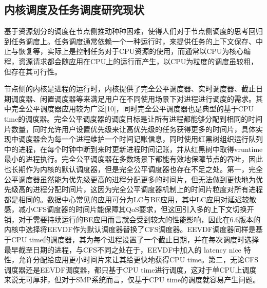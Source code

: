 \subsection{内核调度及任务调度研究现状}

基于资源划分的调度在节点侧推动种种困难，使得人们对于节点侧调度的思考回归到任务调度上\citep{fried2020caladan, ousterhout2019shenango, prekas2017zygos}。任务调度通常依赖一个一种运行时，来提供任务的上下文保存、中止与恢复等，实际上是控制任务对于CPU资源的使用，而通常以CPU为核心编程，资源请求都会随应用在CPU上的运行而产生，以CPU为粒度的调度虽较粗，但存在其可行性。

节点侧的内核是进程的运行时，内核提供了完全公平调度器、实时调度器、截止日期调度器、闲置调度器等来满足用户在不同使用场景下对进程进行调度的需求。其中完全公平调度器应用较为广泛[10]，同时完全公平调度器也是典型的基于CPU time的调度器。完全公平调度器的调度目标是让所有进程都能够分配到相同的时间片数量，同时允许用户设置优先级来让高优先级的任务获得更多的时间片，具体实现中调度器会为每一个进程维护一个时间记账信息，同时使用红黑树组织运行队列中的进程，在每个时钟中断到来时更新进程时间记账，并从红黑树中取得vruntime最小的进程执行。完全公平调度器在多数场景下都能有效地保障节点的吞吐，因此也长期作为内核的默认调度器，但是完全公平调度器也存在不足之处。第一，完全公平调度器虽然能为优先级更高的进程分配更多的时间片，但无法做到更快地为优先级高的进程分配时间片，这因为完全公平调度器机制上的时间片粒度对所有进程都是相同的。数据中心常见的应用可分为LC与BE应用，其中LC应用对延迟较敏感，减小CFS调度器的时间片能保障其QoS要求，但这回引入多的上下文切换开销，对于需要持续运行的BE应用而言就会受到较大的性能影响，因此在6.6版本的内核中选择将EEVDF作为默认调度器替换了CFS调度器。EEVDF调度器同样是基于CPU time的调度器，其为每个进程设置了一个截止日期，并在每次调度时选择最早截至日期的进程\citep{stoica1995earliest}，与CFS不同之处在于，EEVDF中加入的 latency nice 特性，允许分配给应用更小时间片来让其给更快地获得CPU time。第二，无论CFS调度器还是EEVDF调度器，都只基于CPU time进行调度，这对于单CPU上调度来说无可厚非，但对于SMP系统而言，仅基于CPU time的调度就容易产生问题。

